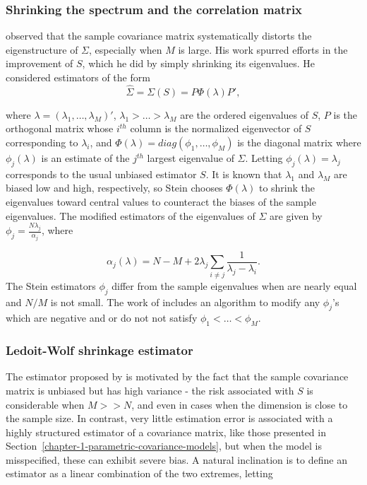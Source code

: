 \subsubsection{Shrinking the spectrum and the correlation matrix}

\cite{stein1975estimation} observed that the sample covariance matrix systematically distorts the eigenstructure of $\Sigma$, especially when $M$ is large. His work spurred efforts in the improvement of $S$, which he did by simply shrinking its eigenvalues.  He considered estimators of the form
\begin{equation}\label{eq:stein-eigen-estimator}
\hat{\Sigma} = \Sigma\left(S\right) = P \Phi\left(\lambda\right) P',
\end{equation}

\noindent
where $\lambda = \left(\lambda_1, \dots, \lambda_M\right)'$, $\lambda_1 > \dots > \lambda_M$ are the ordered eigenvalues of $S$, $P$ is the orthogonal matrix whose $i^{th}$ column is the normalized eigenvector of $S$ corresponding to $\lambda_i$, and $\Phi\left(\lambda\right) = diag\left(\phi_1,\dots, \phi_M \right)$ is the diagonal matrix where $\phi_j\left(\lambda \right)$ is an estimate of the $j^{th}$ largest eigenvalue of $\Sigma$. Letting $\phi_j\left(\lambda \right) = \lambda_j$ corresponds to the usual unbiased estimator $S$. It is known that $\lambda_1$ and $\lambda_M$ are biased low and high, respectively, so Stein chooses $\Phi\left(\lambda\right)$ to shrink the eigenvalues toward central values to counteract the biases of the sample eigenvalues. The modified estimators of the eigenvalues of $\Sigma$ are given by $\phi_j = \frac{N \lambda_j}{\alpha_j}$, where

\begin{equation}\label{eq:stein-eigen-estimator}
\alpha_j\left(\lambda\right) = N - M + 2\lambda_j \sum_{i \ne j} \frac{1}{\lambda_j - \lambda_i}.
\end{equation}
\noindent
The Stein estimators $\phi_j$ differ from the sample eigenvalues when are nearly equal and $N/M$ is not small. The work of \cite{lin1985monte} includes an algorithm to modify any $\phi_j$'s which are negative and or do not not satisfy $\phi_1 < \dots < \phi_M$.

\subsubsection{Ledoit-Wolf shrinkage estimator}

The estimator proposed by \cite{ledoit2004well} is motivated by the fact that the sample covariance matrix is unbiased but has high variance - the risk associated with $S$ is considerable when $M >> N$, and even in cases when the dimension is close to the sample size. In contrast, very little estimation error is associated with a highly structured estimator of a covariance matrix, like those presented in Section~\ref{chapter-1-parametric-covariance-models}, but when the model is misspecified, these can exhibit severe bias. A natural inclination is to define an estimator as a linear combination of the two extremes, letting

